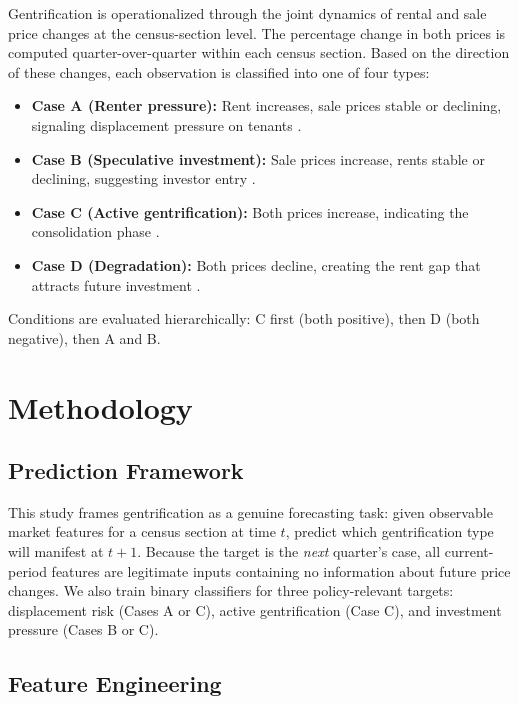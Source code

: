 \documentclass[12pt,a4paper]{article}
\begin{document}
Gentrification is operationalized through the joint dynamics of rental and sale price changes at the census-section level. The percentage change in both prices is computed quarter-over-quarter within each census section. Based on the direction of these changes, each observation is classified into one of four types:

\begin{itemize}
    \item \textbf{Case A (Renter pressure):} Rent increases, sale prices stable or declining, signaling displacement pressure on tenants \citep{aja2007vulnerabilidad}.
    \item \textbf{Case B (Speculative investment):} Sale prices increase, rents stable or declining, suggesting investor entry \citep{smith2005rent}.
    \item \textbf{Case C (Active gentrification):} Both prices increase, indicating the consolidation phase \citep{hackworth2001changing}.
    \item \textbf{Case D (Degradation):} Both prices decline, creating the rent gap that attracts future investment \citep{smith2005rent}.
\end{itemize}

Conditions are evaluated hierarchically: C first (both positive), then D (both negative), then A and B.

\section{Methodology}

\subsection{Prediction Framework}

This study frames gentrification as a genuine forecasting task: given observable market features for a census section at time $t$, predict which gentrification type will manifest at $t{+}1$. Because the target is the \textit{next} quarter's case, all current-period features are legitimate inputs containing no information about future price changes. We also train binary classifiers for three policy-relevant targets: displacement risk (Cases A or C), active gentrification (Case C), and investment pressure (Cases B or C).

\subsection{Feature Engineering}
\end{document}
